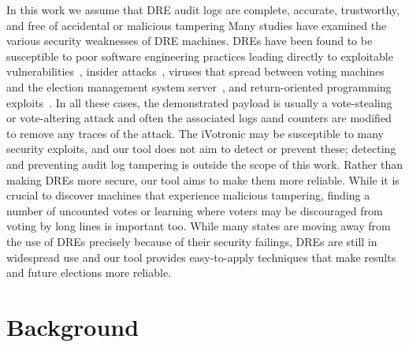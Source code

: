 \documentclass[letterpaper,twocolumn,10pt]{article}
\begin{document}
In this work we assume that DRE audit logs
are complete, accurate, trustworthy, and free of accidental or malicious
tampering
Many studies have examined the various security weaknesses of DRE machines. DREs
have been found to be susceptible to poor software
engineering practices leading directly to exploitable
vulnerabilities~\cite{kohno2008, butler-evt08}, insider attacks~\cite{appel-evtwote09}, viruses that spread
between voting machines and the election management system
server~\cite{calandrino-toptobottom, Feldman07},  and
return-oriented programming exploits~\cite{Checkoway2009}. In all these cases, the demonstrated
payload is usually a vote-stealing or vote-altering attack and often the
associated logs aand counters are modified to remove any traces of the attack. 
The iVotronic may be susceptible to many security exploits, and our tool does
not aim to detect or prevent these; detecting and preventing audit log tampering is outside the scope of
this work. Rather than making DREs more secure, our tool aims to make them  
more reliable. While it is crucial to discover machines that experience malicious 
tampering, finding a number of uncounted votes or learning where voters may be
discouraged from voting by long lines is important too. While many states are
moving away from the use of DREs precisely because of their security failings,
DREs are still in widespread use and our tool provides easy-to-apply techniques
that make results and future elections more reliable.

\section{Background}
\end{document}
